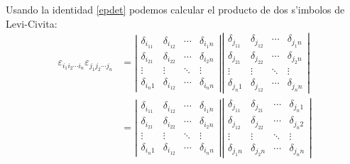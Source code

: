 Usando la identidad \eqref{epdet} podemos calcular el producto de dos s'imbolos de Levi-Civita:
\begin{align}
\varepsilon_{i_1i_2\cdots i_n}\varepsilon_{j_1j_2\cdots j_n} &=  \left|\begin{array}{cccc}
\delta_{i_11} & \delta_{i_12} & \cdots & \delta_{i_1n} \\ 
\delta_{i_21} & \delta_{i_22} & \cdots & \delta_{i_2n} \\ 
\vdots & \vdots & \ddots & \vdots \\ 
\delta_{i_n1} & \delta_{i_12} & \cdots & \delta_{i_nn}
\end{array} \right|   \left|\begin{array}{cccc}
\delta_{j_11} & \delta_{j_12} & \cdots & \delta_{j_1n} \\ 
\delta_{j_21} & \delta_{j_22} & \cdots & \delta_{j_2n} \\ 
\vdots & \vdots & \ddots & \vdots \\ 
\delta_{j_n1} & \delta_{j_12} & \cdots & \delta_{j_nn}
\end{array} \right| \\
&=   \left|\begin{array}{cccc}
\delta_{i_11} & \delta_{i_12} & \cdots & \delta_{i_1n} \\ 
\delta_{i_21} & \delta_{i_22} & \cdots & \delta_{i_2n} \\ 
\vdots & \vdots & \ddots & \vdots \\ 
\delta_{i_n1} & \delta_{i_12} & \cdots & \delta_{i_nn}
\end{array} \right|   \left|\begin{array}{cccc}
\delta_{j_11} & \delta_{j_21} & \cdots & \delta_{j_n1} \\ 
\delta_{j_12} & \delta_{j_22} & \cdots & \delta_{j_n2} \\ 
\vdots & \vdots & \ddots & \vdots \\ 
\delta_{j_1n} & \delta_{j_2n} & \cdots & \delta_{j_nn}
\end{array} \right| \label{truco}\\

\end{align}
